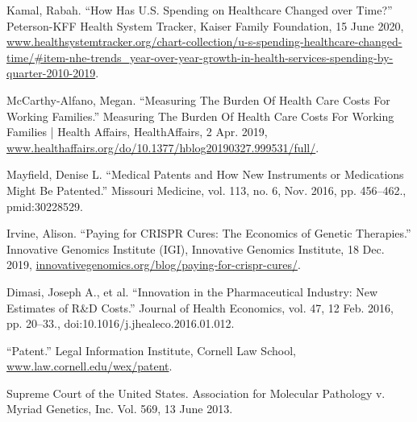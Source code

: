 \documentclass[12pt]{article}
\begin{document}
\begin{thebibliography}{7}

	Kamal, Rabah. “How Has U.S. Spending on Healthcare Changed over Time?” Peterson-KFF Health System Tracker, Kaiser Family Foundation, 15 June 2020, \href{www.healthsystemtracker.org/chart-collection/u-s-spending-healthcare-changed-time/\#item-nhe-trends_year-over-year-growth-in-health-services-spending-by-quarter-2010-2019}{www.healthsystemtracker.org/chart-collection/u-s-spending-healthcare-changed-time/\#item-nhe-trends\_year-over-year-growth-in-health-services-spending-by-quarter-2010-2019}.

	McCarthy-Alfano, Megan. “Measuring The Burden Of Health Care Costs For Working Families.” Measuring The Burden Of Health Care Costs For Working Families | Health Affairs, HealthAffairs, 2 Apr. 2019, \href{www.healthaffairs.org/do/10.1377/hblog20190327.999531/full/}{www.healthaffairs.org/do/10.1377/hblog20190327.999531/full/}.

	Mayfield, Denise L. “Medical Patents and How New Instruments or Medications Might Be Patented.”
Missouri Medicine, vol. 113, no. 6, Nov. 2016, pp. 456–462., pmid:30228529.

	Irvine, Alison. “Paying for CRISPR Cures: The Economics of Genetic Therapies.” Innovative Genomics Institute (IGI), Innovative Genomics Institute, 18 Dec. 2019, \href{innovativegenomics.org/blog/paying-for-crispr-cures/}{innovativegenomics.org/blog/paying-for-crispr-cures/}.

	Dimasi, Joseph A., et al. “Innovation in the Pharmaceutical Industry: New Estimates of R\&D Costs.” Journal of Health Economics, vol. 47, 12 Feb. 2016, pp. 20–33., doi:10.1016/j.jhealeco.2016.01.012.

	“Patent.” Legal Information Institute, Cornell Law School, \href{www.law.cornell.edu/wex/patent}{www.law.cornell.edu/wex/patent}.

	Supreme Court of the United States. Association for Molecular Pathology v. Myriad Genetics, Inc. Vol. 569, 13 June 2013.

\end{thebibliography}
\end{document}
